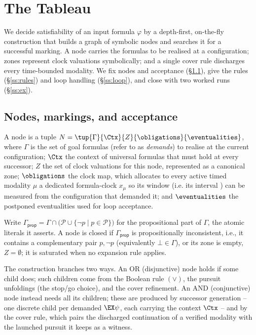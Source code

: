 \section{The Tableau}\label{sec:tableau}

We decide satisfiability of an input formula $\varphi$ by a depth-first, on-the-fly construction that builds
a graph of symbolic nodes and searches it for a {successful marking}. A node carries the
formulas to be realised at a configuration; zones represent clock valuations symbolically; and a single
{cover} rule discharges every time-bounded modality. We fix nodes and acceptance (\S\ref{ss:nodes}),
give the rules (\S\ref{ss:rules}) and loop handling (\S\ref{ss:loop}), and close with two worked runs
(\S\ref{ss:ex}).

\subsection{Nodes, markings, and acceptance}\label{ss:nodes}

A {node} is a tuple $N=\tup{\Gamma}{\Ctx}{Z}{\obligations}{\eventualities}$, where $\Gamma$ is the set of
goal formulas (refer to as \emph{demands}) to realise at the current configuration; $\Ctx$ the {context} of universal formulas that must
hold at every successor; $Z$ the set of clock valuations for this node, represented as a canonical zone; $\obligations$ the {clock map}, which allocates to every active timed modality $\mu$ a dedicated formula-clock $x_\mu$ so its window (i.e. its interval \kI) can be measured from the configuration that demanded it; and $\eventualities$ the postponed eventualities used for loop
acceptance. 

Write $\Gamma_{\mathsf{prop}}=\Gamma\cap\big(\mathcal P\cup\{\neg p\mid p\in\mathcal P\}\big)$ for the {propositional part} of $\Gamma$, the atomic literals it asserts. A node is {closed} if $\Gamma_{\mathsf{prop}}$ is propositionally inconsistent, i.e., it contains a complementary pair $p,\neg p$ (equivalently $\bot\in\Gamma$), or its zone is empty, $Z=\emptyset$; it is {saturated} when no expansion rule applies.

The construction branches two ways. An {OR} (disjunctive) node holds if {some} child does; such children come from the Boolean rule $(\vee)$, the pursuit unfoldings (the {stop}/{go} choice), and the cover refinement. An {AND} (conjunctive) node instead needs {all} its children; these are produced by successor generation -- one discrete child per demanded $\EX\psi$, each carrying the context $\Ctx$ -- and by the cover rule, which pairs the discharged continuation of a verified modality with the launched pursuit it keeps as a witness.



